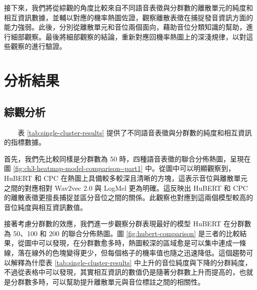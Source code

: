         接下來，我們將從綜觀的角度比較來自不同語音表徵與分群數的離散單元的純度和相互資訊數據，並輔以對應的機率熱圖佐證，觀察離散表徵在捕捉發音資訊方面的能力強弱。此後，分別從離散單元和音位兩個面向，藉助音位分類知識的幫助，進行細部觀察。最後將細部觀察的結論，重新對應回機率熱圖上的深淺規律，以對這些觀察的進行驗證。

\section{分析結果}

\subsection{綜觀分析}

　　表 \ref{tab:single-cluster-results} 提供了不同語音表徵與分群數的純度和相互資訊的指標數據。

        首先，我們先比較同樣是分群數為 50 時，四種語音表徵的聯合分佈熱圖，呈現在圖 \ref{fig:ch3-heatmap-model-comparison--part1} 中。從圖中可以明顯觀察到，HuBERT 和 CPC 在熱圖上具備較多較深且清晰的方塊，這表示音位與離散單元之間的對應相對 Wav2vec 2.0 與 LogMel 更為明確。這反映出 HuBERT 和 CPC 的離散表徵更擅長捕捉並區分音位之間的關係。此觀察也對應到這兩個模型較高的音位純度與相互資訊數值。

        接著考慮分群數的效應，我們進一步觀察分群表現最好的模型 HuBERT 在分群數為 50、100 和 200 的聯合分佈熱圖。圖 \ref{fig:hubert-comparison} 是三者的比較結果，從圖中可以發現，在分群數愈多時，熱圖較深的區域愈是可以集中連成一條線，落在線外的色塊變得更少，但每個格子的機率值也隨之迅速降低。這個趨勢可以解釋為什麼表 \ref{tab:single-cluster-results} 中上升的音位純度與下降的分群純度，不過從表格中可以發現，其實相互資訊的數值仍是隨著分群數上升而提高的，也就是分群數多時，可以幫助提升離散單元與音位標註之間的相關性。

